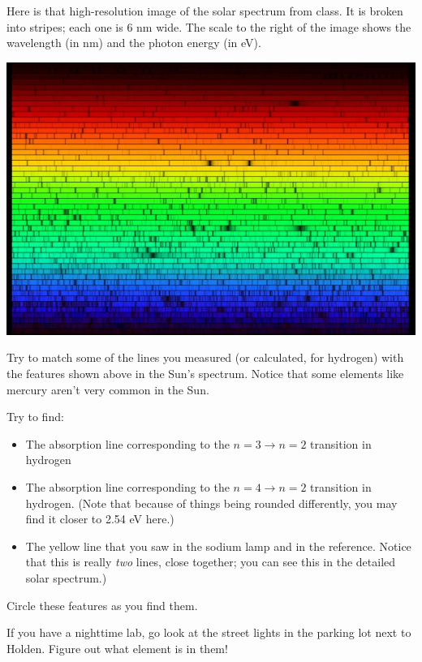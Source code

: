 \documentclass[11pt]{article}
\begin{document}
Here is that high-resolution image of the solar spectrum from class. It is broken into stripes; each one is 6 nm
wide. The scale to the right of the image shows the wavelength (in nm) and the photon energy (in eV).
\begin{center}
\includegraphics[width=1.0\textwidth]{solarspectrum.jpg}
\end{center}

Try to match some of the lines you measured (or calculated, for hydrogen) with the features shown above
in the Sun's spectrum. Notice that some elements like mercury aren't very common in the Sun.

Try to find:

\begin{itemize}
\item The absorption line corresponding to the $n=3 \rightarrow n=2$ transition in hydrogen
\item The absorption line corresponding to the $n=4 \rightarrow n=2$ transition in hydrogen. (Note that because of things being rounded differently, you may find it closer to 2.54 eV here.)
\item The yellow line that you saw in the sodium lamp and in the reference. Notice that this is really
{\it two} lines, close together; you can see this in the detailed solar spectrum.)
\end{itemize}

Circle these features as you find them.

If you have a nighttime lab, go look at the street lights in the parking lot next to Holden. Figure out what element is in them!


\begin{center}
	
	\begin{landscape}
				
	\end{landscape}
	
\end{center}
\newpage
\end{document}
